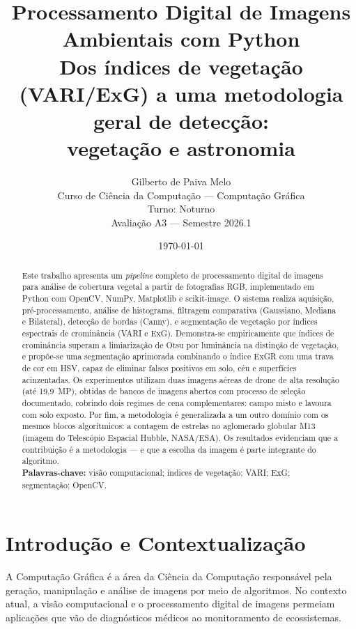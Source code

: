 \documentclass[12pt,a4paper]{article}
\title{\textbf{Processamento Digital de Imagens Ambientais com Python}\\
\large Dos índices de vegetação (VARI/ExG) a uma metodologia geral de detecção:\\
\large vegetação e astronomia}
\author{
  Gilberto de Paiva Melo \\
  \small Curso de Ciência da Computação --- Computação Gráfica \\
  \small Turno: Noturno \\
  \small Avaliação A3 --- Semestre 2026.1
}
\date{\today}
\begin{document}
\maketitle

\begin{abstract}
\noindent
Este trabalho apresenta um \emph{pipeline} completo de processamento digital de imagens
para análise de cobertura vegetal a partir de fotografias RGB, implementado em Python com
OpenCV, NumPy, Matplotlib e scikit-image. O sistema realiza aquisição, pré-processamento,
análise de histograma, filtragem comparativa (Gaussiano, Mediana e Bilateral), detecção de
bordas (Canny), e segmentação de vegetação por índices espectrais de crominância (VARI e ExG).
Demonstra-se empiricamente que índices de crominância superam a limiarização de Otsu por
luminância na distinção de vegetação, e propõe-se uma segmentação aprimorada combinando o
índice ExGR com uma trava de cor em HSV, capaz de eliminar falsos positivos em solo, céu e
superfícies acinzentadas. Os experimentos utilizam duas imagens aéreas de drone de alta
resolução (até 19,9~MP), obtidas de bancos de imagens abertos com processo de seleção
documentado, cobrindo dois regimes de cena complementares: campo misto e lavoura com solo
exposto. Por fim, a metodologia é generalizada a um outro domínio com os mesmos blocos
algorítmicos: a contagem de estrelas no aglomerado globular M13 (imagem do Telescópio
Espacial Hubble, NASA/ESA). Os resultados evidenciam que a contribuição é a metodologia ---
e que a escolha da imagem é parte integrante do algoritmo.
\\[1ex]
\textbf{Palavras-chave:} visão computacional; índices de vegetação; VARI; ExG; segmentação; OpenCV.
\end{abstract}

\tableofcontents
\newpage

\section{Introdução e Contextualização}

A Computação Gráfica é a área da Ciência da Computação responsável pela geração, manipulação
e análise de imagens por meio de algoritmos. No contexto atual, a visão computacional e o
processamento digital de imagens permeiam aplicações que vão de diagnósticos médicos ao
monitoramento de ecossistemas.
\end{document}
